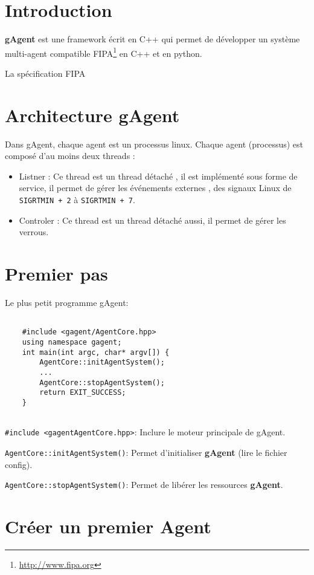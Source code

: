 \section{Introduction}
\textbf{gAgent} est une framework écrit en C++ qui permet de développer un système multi-agent compatible FIPA\footnote{\url{http://www.fipa.org}} en C++ et en python.


La spécification FIPA


\section{Architecture gAgent}

Dans gAgent, chaque agent est un processus linux. Chaque agent (processus) est composé d'au moins deux threads :
\begin{itemize}
 \item Listner :  Ce thread est un thread détaché , il est implémenté sous forme de service, il permet de gérer les événements externes , 
		  des signaux Linux de \texttt{SIGRTMIN + 2} à \texttt{SIGRTMIN + 7}.
 \item Controler : Ce thread est un thread détaché aussi, il permet de gérer les verrous.
\end{itemize}


\section{Premier pas}
Le plus petit programme gAgent:

\begin{lstlisting}

	#include <gagent/AgentCore.hpp>
	using namespace gagent;
	int main(int argc, char* argv[]) {
		AgentCore::initAgentSystem();
		...
		AgentCore::stopAgentSystem();
		return EXIT_SUCCESS;
	}
	
\end{lstlisting}

\texttt{\#include <gagent\/AgentCore.hpp>}: Inclure le moteur principale de gAgent.

\texttt{AgentCore::initAgentSystem()}: Permet d'initialiser \textbf{gAgent} (lire le fichier config).

\texttt{AgentCore::stopAgentSystem()}: Permet de libérer les ressources \textbf{gAgent}.

\section{Créer un premier Agent}

